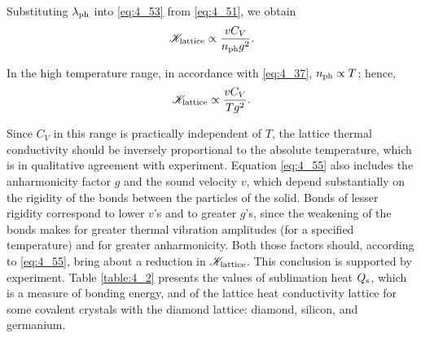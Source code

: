 \noindent
Substituting $\lambda_{\text{ph}}$ into \eqref{eq:4_53} from \eqref{eq:4_51}, we obtain
\begin{equation}\label{eq:4_54}
    \mathscr{K}_{\text{lattice}} \propto \frac{v C_V}{n_{\text{ph}} g^2}.
\end{equation}

In the high temperature range, in accordance with \eqref{eq:4_37}, $n_{\text{ph}}\propto T$; hence,
\begin{equation}\label{eq:4_55}
    \mathscr{K}_{\text{lattice}} \propto \frac{v C_V}{T g^2}.
\end{equation}

Since $C_V$ in this range is practically independent of $T$, the lattice thermal conductivity should be inversely proportional to the absolute temperature, which is in qualitative agreement with experiment. Equation \eqref{eq:4_55} also includes the anharmonicity factor $g$ and the sound velocity $v$, which depend substantially on the rigidity of the bonds between the particles of the solid. Bonds of lesser rigidity correspond to lower $v$'s and to greater $g$'s, since the weakening of the bonds makes for greater thermal vibration amplitudes (for a specified temperature) and for greater anharmonicity. Both those factors should, according to \eqref{eq:4_55}, bring about a reduction in $\mathscr{K}_{\text{lattice}}$. This conclusion is supported by experiment. Table \ref{table:4_2} presents the values of sublimation heat $Q_{\text{s}}$, which is a measure of bonding energy, and of the lattice heat conductivity lattice for some covalent crystals with the diamond lattice: diamond, silicon, and germanium.

\begin{table}[!b]
	\renewcommand{\arraystretch}{1.2}
	\caption{}
	\vspace{-0.6cm}
	\label{table:4_2}
	\begin{center}\end{center}
\end{table}

